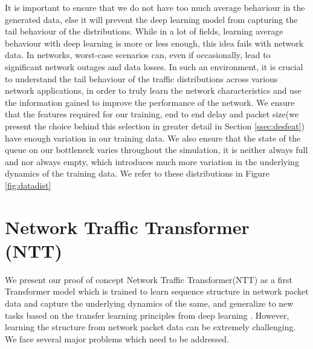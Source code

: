 It is important to ensure that we do not have too much average behaviour in the generated data, else it will prevent the deep learning model from capturing the tail behaviour of the distributions. While in a lot of fields, learning average behaviour with deep learning is more or less enough, this idea fails with network data. In networks, worst-case scenarios can, even if occasionally, lead to significant network outages and data losses. In such an environment, it is crucial to understand the tail behaviour of the traffic distributions across various network applications, in order to truly learn the network characteristics and use the information gained to improve the performance of the network. We ensure that the features required for our training, end to end delay and packet size(we present the choice behind this selection in greater detail in Section \ref{ssec:desfeat}) have enough variation in our training data. We also ensure that the state of the queue on our bottleneck varies throughout the simulation, \ie it is neither always full and nor always empty, which introduces much more variation in the underlying dynamics of the training data. We refer to these distributions in Figure \ref{fig:datadist}


\section{Network Traffic Transformer (NTT)}
\label{sec:ntt}

We present our proof of concept Network Traffic Transformer(NTT) as a first Transformer model which is trained to learn sequence structure in network packet data and capture the underlying dynamics of the same, and generalize to new tasks based on the transfer learning principles from deep learning . However, learning the structure from network packet data can be extremely challenging. We face several major problems which need to be addressed.

